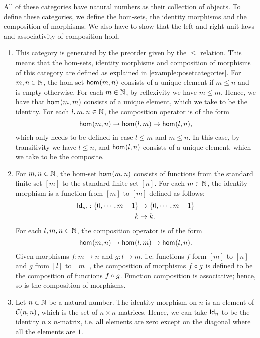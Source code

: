 \begin{solution}
\label{sol:categories_with_natural_numbers}
All of these categories have natural numbers as their collection of objects. To define these categories, we define the hom-sets, the identity morphisms and the composition of morphisms. We also have to show that the left and right unit laws and associativity of composition hold.  
\begin{enumerate}
\item This category is generated by the preorder given by the $\leq$ relation. This means that the hom-sets, identity morphisms and composition of morphisms of this category are defined as explained in \cref{example:posetcategories}. 
For $m,n \in \NN$, the hom-set $\Hom m n$ consists of a unique element if $m \leq n$ and is empty otherwise. For each $m \in \NN$, by reflexivity we have $m \leq m$. Hence, we have that $\Hom m m$ consists of a unique element, which we take to be the identity.
For each $l, m, n\in \NN$, the composition operator is of the form
\[
\Hom m n \to \Hom l m \to \Hom l n,
\]
which only needs to be defined in case $l \leq m$ and $m \leq n$. In this case, by transitivity we have $l \leq n$, and $\Hom l n$ consists of a unique element, which we take to be the composite. 
\item For $m,n \in \NN$, the hom-set $\Hom m n$ consists of functions from the standard finite set $[m]$ to the standard finite set $[n]$.
For each $m \in \NN$, the identity morphism is a function from $[m]$ to $[m]$ defined as follows: 
\begin{align*}
	\Id[m] :  \{0, \cdots , m-1\} & \to \{0, \cdots , m-1\} \\
	k & \mapsto k.
\end{align*}
For each $l, m, n\in \NN$, the composition operator is of the form
\[
\Hom m n \to \Hom l m \to \Hom l n. 
\]
Given morphisms $f : m \to n$ and $g : l \to m $, i.e. functions $f$ form $[m]$ to $[n]$ and $g$ from $[l]$ to $[m]$, the composition of morphisms $\co{g}{f}$ is defined to be the composition of functions $\co{g}{f}$.
Function composition is associative; hence, so is the composition of morphisms. 
\item Let $n\in \NN$ be a natural number. The identity morphism on $n$ is an element of $\CHom{\CC}{n}{n}$, which is the set of $n\times n$-matrices. 
Hence, we can take $\Id[n]$ to be the identity $n\times n$-matrix, i.e. all elements are zero except on the diagonal where all the elements are $1$.


\end{enumerate}
\end{solution}
